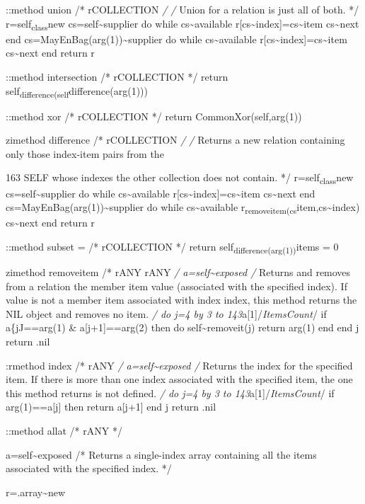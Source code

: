 ::method union /* rCOLLECTION \emph{/ /} Union for a relation is just
all of both. */ r=self\textsubscript{class}new
cs=self\textasciitilde supplier do while cs\textasciitilde available
r{[}cs\textasciitilde index{]}=cs\textasciitilde item
cs\textasciitilde next end cs=MayEnBag(arg(1))\textasciitilde supplier
do while cs\textasciitilde available
r{[}cs\textasciitilde index{]}=cs\textasciitilde item
cs\textasciitilde next end return r

::method intersection /* rCOLLECTION */ return
self\textsubscript{difference(self}difference(arg(1)))

::method xor /* rCOLLECTION */ return CommonXor(self,arg(1))

zimethod difference /* rCOLLECTION \emph{/ /} Returns a new relation
containing only those index-item pairs from the

163 SELF whose indexes the other collection does not contain. */
r=self\textsubscript{class}new cs=self\textasciitilde supplier do while
cs\textasciitilde available
r{[}cs\textasciitilde index{]}=cs\textasciitilde item
cs\textasciitilde next end cs=MayEnBag(arg(1))\textasciitilde supplier
do while cs\textasciitilde available
r\textsubscript{removeitem(cs}item,cs\textasciitilde index)
cs\textasciitilde next end return r

::method subset = /* rCOLLECTION */ return
self\textsubscript{difference(arg(1))}items = 0

zimethod removeitem /* rANY rANY \emph{/ a=self\textasciitilde exposed
/} Returns and removes from a relation the member item value (associated
with the specified index). If value is not a member item associated with
index index, this method returns the NIL object and removes no item.
\emph{/ do j=4 by 3 to 143}a{[}1{]}/\emph{ItemsCount}/ if a\{jJ==arg(1)
\& a{[}j+1{]}==arg(2) then do self\textasciitilde removeit(j) return
arg(1) end end j return .nil

:rmethod index /* rANY \emph{/ a=self\textasciitilde exposed /} Returns
the index for the specified item. If there is more than one index
associated with the specified item, the one this method returns is not
defined. \emph{/ do j=4 by 3 to 143}a{[}1{]}/\emph{ItemsCount}/ if
arg(1)==a{[}j{]} then return a{[}j+1{]} end j return .nil

::method allat /* rANY */

a=self\textasciitilde exposed /* Returns a single-index array containing
all the items associated with the specified index. */

r=.array\textasciitilde new

